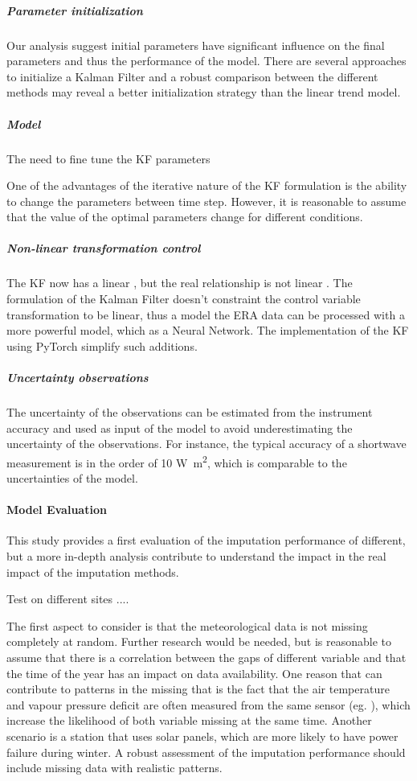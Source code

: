 \documentclass{article}
\begin{document}
\subparagraph{Parameter initialization} Our analysis suggest initial parameters have significant influence on the final parameters and thus the performance of the model. There are several approaches to initialize a Kalman Filter \cite{durbin_time_2012-4} and a robust comparison between the different methods may reveal a better initialization strategy than the linear trend model.  

\subparagraph{Model } The need to fine tune the KF parameters

One of the advantages of the iterative nature of the KF formulation is the ability to change the parameters between time step.  However, it is reasonable to assume that the value of the optimal parameters change for different conditions. 

\subparagraph{Non-linear transformation control} The KF now has a linear , but the real relationship is not linear . The formulation of the Kalman Filter doesn't constraint the control variable transformation to be linear, thus a model the ERA data can be processed with a more powerful model, which as a Neural Network. The implementation of the KF using PyTorch simplify such additions.

\subparagraph{Uncertainty observations} The uncertainty of the observations can be estimated from the instrument accuracy and used as input of the model to avoid underestimating the uncertainty of the observations. For instance, the typical accuracy of a shortwave measurement is in the order of 10 \si{W\m^2}, which is comparable to the uncertainties of the model.

\paragraph{Model Evaluation} This study provides a first evaluation of the imputation performance of different, but a more in-depth analysis contribute to understand the impact in the real impact of the imputation methods.

Test on different sites ....

The first aspect to consider is that the meteorological data is not missing completely at random. Further research would be needed, but is reasonable to assume that there is a correlation between the gaps of different variable and that the time of the year has an impact on data availability. One reason that can contribute to patterns in the missing that is the fact that the air temperature and vapour pressure deficit are often measured from the same sensor (eg. \cite{noauthor_specification_nodate}), which increase the likelihood of both variable missing at the same time. Another scenario is a station that uses solar panels, which are more likely to have power failure during winter. A robust assessment of the imputation performance should include missing data with realistic patterns.
\end{document}
